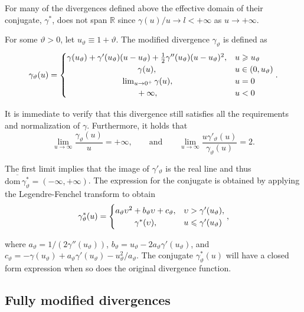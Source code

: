 \documentclass[
  letterpaper,
  DIV=11,
  numbers=noendperiod]{scrartcl}
\begin{document}
For many of the divergences defined above the effective domain of their
conjugate, \(\gamma^*\), does not span \(\mathbb{R}\) since
\(\gamma(u)/u \to l < +\infty\) as \(u \to +\infty\).

For some \(\vartheta>0\), let \(u_{\vartheta}\equiv 1+\vartheta\). The
modified divergence \(\gamma_{\vartheta}\) is defined as \[
\gamma_{\vartheta}(u) = \begin{cases}
  \gamma(u_{\vartheta}) + \gamma'(u_{\vartheta})(u-u_{\vartheta}) + \frac{1}{2}\gamma''(u_{\vartheta})(u-u_{\vartheta})^2, & u\geqslant u_{\vartheta}\\
  \newline\gamma(u), & u\in (0,u_{\vartheta})\\
  \newline \lim_{u\to 0^{+}} \gamma(u), & u=0 \\
  \newline+\infty, &  u<0
\end{cases}.
\]

It is immediate to verify that this divergence still satisfies all the
requirements and normalization of \(\gamma\). Furthermore, it holds that
\[
  \lim_{u\to\infty}\frac{\gamma_{\vartheta}(u)}{u} = +\infty,
    \qquad \text{and}\qquad
  \lim_{u\to\infty}\frac{u\gamma'_{\vartheta}(u)}{\gamma_{\vartheta}(u)} = 2.
\]

The first limit implies that the image of \(\gamma'_{\vartheta}\) is the
real line and thus
\(\overline{\mathrm{dom}\,\gamma^*_{\vartheta}}=(-\infty,+\infty)\). The
expression for the conjugate is obtained by applying the
Legendre-Fenchel transform to obtain \[
\gamma_{\vartheta}^*(u) =
\begin{cases}
  a_{\vartheta}\upsilon^2 + b_{\vartheta}\upsilon + c_{\vartheta}, & \upsilon>\gamma'(u_{\vartheta}),\\
  \newline \gamma^*(\upsilon), & u\leqslant \gamma'(u_{\vartheta})
\end{cases},
\]

where \(a_{\vartheta} = 1/(2\gamma''(u_{\vartheta}))\),
\(b_{\vartheta}=u_{\vartheta} - 2a_{\vartheta}\gamma'(u_{\vartheta})\),
and \(c_{\vartheta}=-\gamma(u_{\vartheta}) +
a_{\vartheta}\gamma'(u_{\vartheta}) - u_{\vartheta}^2/a_{\vartheta}\).
The conjugate \(\gamma_{\vartheta}^*(u)\) will have a closed form
expression when so does the original divergence function.

\subsection{Fully modified
divergences}\label{fully-modified-divergences}
\end{document}

